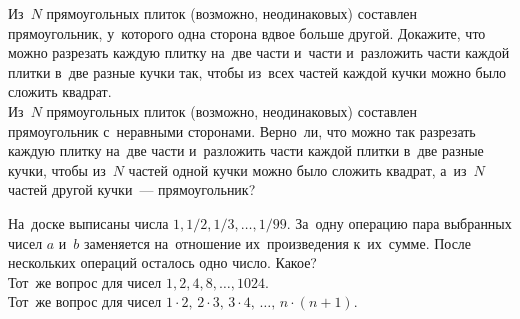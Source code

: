 \begin{problems}

\item
\subproblem
Из~$N$ прямоугольных плиток (возможно, неодинаковых) составлен прямоугольник,
у~которого одна сторона вдвое больше другой.
Докажите, что можно разрезать каждую плитку на~две части и~части и~разложить
части каждой плитки в~две разные кучки так, чтобы из~всех частей каждой кучки
можно было сложить квадрат.
\\
\subproblem
Из~$N$ прямоугольных плиток (возможно, неодинаковых) составлен прямоугольник
с~неравными сторонами.
Верно~ли, что можно так разрезать каждую плитку на~две части и~разложить части
каждой плитки в~две разные кучки, чтобы из~$N$ частей одной кучки можно было
сложить квадрат, а~из~$N$ частей другой кучки~--- прямоугольник?

\item
\subproblem
На~доске выписаны числа $1, 1/2, 1/3, \ldots, 1/99$.
За~одну операцию пара выбранных чисел $a$ и~$b$ заменяется на~отношение
их~произведения к~их~сумме.
После нескольких операций осталось одно число.
Какое?
\\
\subproblem
Тот~же вопрос для чисел $1, 2, 4, 8, \ldots, 1024$.
\\
\subproblem
Тот~же вопрос для чисел
$1 \cdot 2, \, 2 \cdot 3, \, 3 \cdot 4, \, \ldots, \, n \cdot (n + 1)$.

\end{problems}

